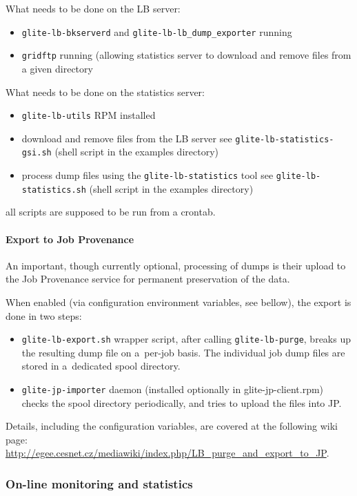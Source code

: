 What needs to be done on the LB server:
\begin{itemize}
\item \verb'glite-lb-bkserverd' and \verb'glite-lb-lb_dump_exporter' running
\item \verb'gridftp' running (allowing statistics server to download and remove files from 
a given directory
\end{itemize}


What needs to be done on the statistics server:
\begin{itemize}
\item \verb'glite-lb-utils' RPM installed
\item download and remove files from the LB server
see \verb'glite-lb-statistics-gsi.sh' (shell script in the examples directory)
\item process dump files using the \verb'glite-lb-statistics' tool
see \verb'glite-lb-statistics.sh' (shell script in the examples directory)
\end{itemize}
all scripts are supposed to be run from a crontab.


\paragraph{Export to Job Provenance}

An important, though currently optional, processing of \LB dumps
is their upload to the Job Provenance service for permanent preservation
of the data.


When enabled (via configuration environment variables, see bellow), 
the export is done in two steps:
\begin{itemize}
\item \verb'glite-lb-export.sh' wrapper script, after calling \verb'glite-lb-purge', breaks up the resulting dump file on a~per-job basis.
The individual job dump files are stored in a~dedicated spool directory.
\item \verb'glite-jp-importer' daemon (installed optionally in glite-jp-client.rpm) checks the spool directory periodically,
and tries to upload the files into JP.
\end{itemize}

Details, including the configuration variables, are covered at the following
wiki page:
\url{http://egee.cesnet.cz/mediawiki/index.php/LB_purge_and_export_to_JP}.

\subsubsection{On-line monitoring and statistics}

